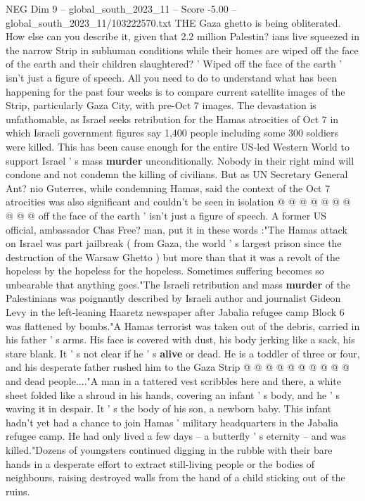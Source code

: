 \begin{textsample}{NEG Dim 9 – global\_south\_2023\_11 – Score -5.00 – global\_south\_2023\_11/103222570.txt}  \label{ex:f9_neg_314}
THE Gaza ghetto is being obliterated.
How else can you describe it, given that 2.2 million Palestin? ians live squeezed in the narrow Strip in subhuman conditions while their homes are wiped off the face of the earth and their children slaughtered? ' Wiped off the face of the earth ' isn't just a figure of speech.
All you need to do to understand what has been happening for the past four weeks is to compare current satellite images of the Strip, particularly Gaza City, with pre-Oct 7 images.
The devastation is unfathomable, as Israel seeks retribution for the Hamas atrocities of Oct 7 in which Israeli government figures say 1,400 people including some 300 soldiers were killed.
This has been cause enough for the entire US-led Western World to support Israel ' s mass \textbf{murder} unconditionally.
Nobody in their right mind will condone and not condemn the killing of civilians.
But as UN Secretary General Ant? nio Guterres, while condemning Hamas, said the context of the Oct 7 atrocities was also significant and couldn't be seen in isolation @ @ @ @ @ @ @ @ @ @ off the face of the earth ' isn't just a figure of speech.
A former US official, ambassador Chas Free? man, put it in these words :"The Hamas attack on Israel was part jailbreak ( from Gaza, the world ' s largest prison since the destruction of the Warsaw Ghetto ) but more than that it was a revolt of the hopeless by the hopeless for the hopeless.
Sometimes suffering becomes so unbearable that anything goes."The Israeli retribution and mass \textbf{murder} of the Palestinians was poignantly described by Israeli author and journalist Gideon Levy in the left-leaning Haaretz newspaper after Jabalia refugee camp Block 6 was flattened by bombs."A Hamas terrorist was taken out of the debris, carried in his father ' s arms.
His face is covered with dust, his body jerking like a sack, his stare blank.
It ' s not clear if he ' s \textbf{alive} or dead.
He is a toddler of three or four, and his desperate father rushed him to the Gaza Strip @ @ @ @ @ @ @ @ @ @ and dead people...."A man in a tattered vest scribbles here and there, a white sheet folded like a shroud in his hands, covering an infant ' s body, and he ' s waving it in despair.
It ' s the body of his son, a newborn baby.
This infant hadn't yet had a chance to join Hamas ' military headquarters in the Jabalia refugee camp.
He had only lived a few days -- a butterfly ' s eternity -- and was killed."Dozens of youngsters continued digging in the rubble with their bare hands in a desperate effort to extract still-living people or the bodies of neighbours, raising destroyed walls from the hand of a child sticking out of the ruins.

\end{textsample}
